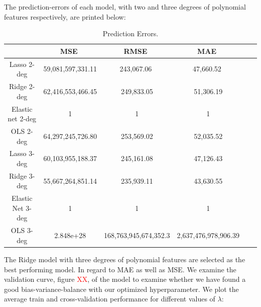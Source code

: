 \documentclass[12pt,a4paper]{article}
\begin{document}
The prediction-errors of each model, with two and three degrees of polynomial features respectively, are printed below:
\begin{table}[H]
\begin{center}
\caption{Prediction Errors. \label{time}}
\begin{tabular}{| c | c | c | c | c | c |} 
\hline
   & \ MSE \ & \, RMSE \ & \ MAE \ \\ \hline
   Lasso 2-deg & 59,081,597,331.11 & \ 243,067.06 \  & \ 47,660.52 \ \\ 
  Ridge 2-deg & 62,416,553,466.45 & 249,833.05 & 51,306.19  \\ 
  Elastic net 2-deg & 1 & 1 & 1  \\ 
  OLS 2-deg & 64,297,245,726.80 & 253,569.02 & 52,035.52  \\ \hline 
  Lasso 3-deg & 60,103,955,188.37 & 245,161.08 & 47,126.43  \\ 
  Ridge 3-deg & 55,667,264,851.14 & 235,939.11 & 43,630.55  \\ 
  Elastic Net 3-deg & 1 & 1 & 1  \\
  OLS 3-deg & 2.848e+28 & 168,763,945,674,352.3 & 2,637,476,978,906.39  \\ \hline
\end{tabular}
\end{center}
\end{table}
The Ridge model with three degrees of polynomial features are selected as the best performing model. In regard to MAE as well as MSE.\newline
We examine the validation curve, figure \textcolor{red}{XX}, of the model to examine whether we have found a good bias-variance-balance with our optimized hyperparameter. We plot the average train and cross-validation performance for different values of $\lambda$: 
\end{document}

